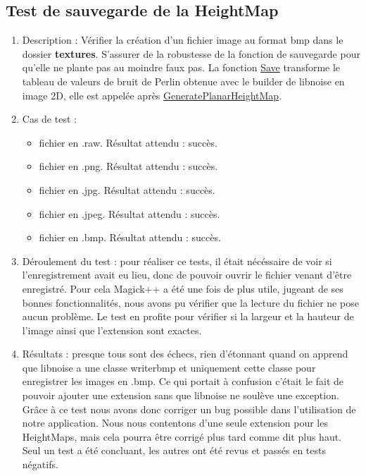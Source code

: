 \documentclass[12pt]{report}
\begin{document}
\subsection{Test de sauvegarde de la HeightMap}
\begin{enumerate}
    \item Description : Vérifier la création d'un fichier image au format bmp dans le dossier \textbf{textures}. S'assurer de la robustesse de la fonction de sauvegarde pour qu'elle ne plante pas au moindre faux pas. La fonction \underline{Save} transforme le tableau de valeurs de bruit de Perlin obtenue avec le builder de libnoise en image 2D, elle est appelée après \underline{GeneratePlanarHeightMap}.
    \item Cas de test :
    \begin{itemize}
        \item fichier en .raw. Résultat attendu : succès.
        \item fichier en .png. Résultat attendu : succès.
        \item fichier en .jpg. Résultat attendu : succès.
        \item fichier en .jpeg. Résultat attendu : succès.
        \item fichier en .bmp. Résultat attendu : succès.
    \end{itemize}
    \item Déroulement du test : pour réaliser ce tests, il était nécéssaire de voir si l'enregistrement avait eu lieu, donc de pouvoir ouvrir le fichier venant d'être enregistré. Pour cela Magick++ a été une fois de plus utile, jugeant de ses bonnes fonctionnalités, nous avons pu vérifier que la lecture du fichier ne pose aucun problème. Le test en profite pour vérifier si la largeur et la hauteur de l'image ainsi que l'extension sont exactes.
    \item Résultats : presque tous sont des échecs, rien d'étonnant quand on apprend que libnoise a une classe writerbmp et uniquement cette classe pour enregistrer les images en .bmp. Ce qui portait à confusion c'était le fait de pouvoir ajouter une extension sans que libnoise ne soulève une exception. Grâce à ce test nous avons donc corriger un bug possible dans l'utilisation de notre application. Nous nous contentons d'une seule extension pour les HeightMaps, mais cela pourra être corrigé plus tard comme dit plus haut. Seul un test a été concluant, les autres ont été revus et passés en tests négatifs.
\end{enumerate}
\end{document}
